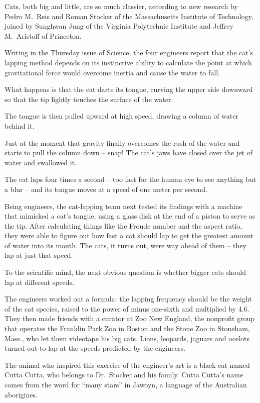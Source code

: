 ﻿\documentclass[12pt]{article}
\begin{document}
Cats, both big and little, are so much classier, according to new research by Pedro M.~Reis and
Roman Stocker of the Massachusetts Institute of Technology, joined by Sunghwan Jung of the Virginia
Polytechnic Institute and Jeffrey M.~Aristoff of Princeton.

Writing in the Thursday issue of Science, the four engineers report that the cat's lapping method
depends on its instinctive ability to calculate the point at which gravitational force would
overcome inertia and cause the water to fall.

What happens is that the cat darts its tongue, curving the upper side downward so that the tip
lightly touches the surface of the water.

The tongue is then pulled upward at high speed, drawing a column of water behind it.

Just at the moment that gravity finally overcomes the rush of the water and starts to pull the
column down -- snap! The cat's jaws have closed over the jet of water and swallowed it.

The cat laps four times a second -- too fast for the human eye to see anything but a blur -- and its
tongue moves at a speed of one meter per second.

Being engineers, the cat-lapping team next tested its findings with a machine that mimicked a cat's
tongue, using a glass disk at the end of a piston to serve as the tip. After calculating things like
the Froude number and the aspect ratio, they were able to figure out how fast a cat should lap to
get the greatest amount of water into its mouth. The cats, it turns out, were way ahead of them --
they lap at just that speed.

To the scientific mind, the next obvious question is whether bigger cats should lap at different
speeds.

The engineers worked out a formula: the lapping frequency should be the weight of the cat species,
raised to the power of minus one-sixth and multiplied by 4.6. They then made friends with a curator
at Zoo New England, the nonprofit group that operates the Franklin Park Zoo in Boston and the Stone
Zoo in Stoneham, Mass., who let them videotape his big cats. Lions, leopards, jaguars and ocelots
turned out to lap at the speeds predicted by the engineers.

The animal who inspired this exercise of the engineer's art is a black cat named Cutta Cutta, who
belongs to Dr.~Stocker and his family. Cutta Cutta's name comes from the word for ``many stars'' in
Jawoyn, a language of the Australian aborigines.
\end{document}
